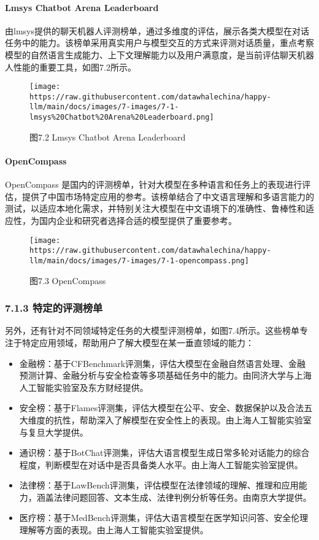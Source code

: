 \documentclass[12pt,a4paper]{book}
\begin{document}
\paragraph{Lmsys Chatbot Arena
Leaderboard}\label{lmsys-chatbot-arena-leaderboard}

由lmsys提供的聊天机器人评测榜单，通过多维度的评估，展示各类大模型在对话任务中的能力。该榜单采用真实用户与模型交互的方式来评测对话质量，重点考察模型的自然语言生成能力、上下文理解能力以及用户满意度，是当前评估聊天机器人性能的重要工具，如图7.2所示。

\begin{figure}[htbp]\centering
\texttt{[image: https://raw.githubusercontent.com/datawhalechina/happy-llm/main/docs/images/7-images/7-1-lmsys\%20Chatbot\%20Arena\%20Leaderboard.png]}
\caption{图7.2 Lmsys Chatbot Arena Leaderboard}
\end{figure}

\paragraph{OpenCompass}\label{opencompass}

OpenCompass
是国内的评测榜单，针对大模型在多种语言和任务上的表现进行评估，提供了中国市场特定应用的参考。该榜单结合了中文语言理解和多语言能力的测试，以适应本地化需求，并特别关注大模型在中文语境下的准确性、鲁棒性和适应性，为国内企业和研究者选择合适的模型提供了重要参考。

\begin{figure}[htbp]\centering
\texttt{[image: https://raw.githubusercontent.com/datawhalechina/happy-llm/main/docs/images/7-images/7-1-opencompass.png]}
\caption{图7.3 OpenCompass}
\end{figure}

\subsubsection{7.1.3
特定的评测榜单}\label{ux7279ux5b9aux7684ux8bc4ux6d4bux699cux5355}

另外，还有针对不同领域特定任务的大模型评测榜单，如图7.4所示。这些榜单专注于特定应用领域，帮助用户了解大模型在某一垂直领域的能力：

\begin{itemize}
\item
  金融榜：基于CFBenchmark评测集，评估大模型在金融自然语言处理、金融预测计算、金融分析与安全检查等多项基础任务中的能力。由同济大学与上海人工智能实验室及东方财经提供。
\item
  安全榜：基于Flames评测集，评估大模型在公平、安全、数据保护以及合法五大维度的抗性，帮助深入了解模型在安全性上的表现。由上海人工智能实验室与复旦大学提供。
\item
  通识榜：基于BotChat评测集，评估大语言模型生成日常多轮对话能力的综合程度，判断模型在对话中是否具备类人水平。由上海人工智能实验室提供。
\item
  法律榜：基于LawBench评测集，评估模型在法律领域的理解、推理和应用能力，涵盖法律问题回答、文本生成、法律判例分析等任务。由南京大学提供。
\item
  医疗榜：基于MedBench评测集，评估大语言模型在医学知识问答、安全伦理理解等方面的表现。由上海人工智能实验室提供。
\end{itemize}
\end{document}
